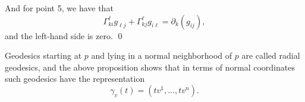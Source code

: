     And for point 5, we have that
    $$ \Gamma^\ell_{ki}g_{\ell j} + \Gamma^\ell_{kj}g_{i\ell} = \partial_k(g_{ij}) , $$
    and the left-hand side is zero.
    \qed

\eproof

\bdefn

    Geodesics starting at $p$ and lying in a normal neighborhood of $p$ are called {\emphcolor radial geodesics},
    and the above proposition shows that in terms of normal coordinates such geodesics have the representation
    $$ \gamma_v(t) = (tv^1,\dots,tv^n) . $$

\edefn

